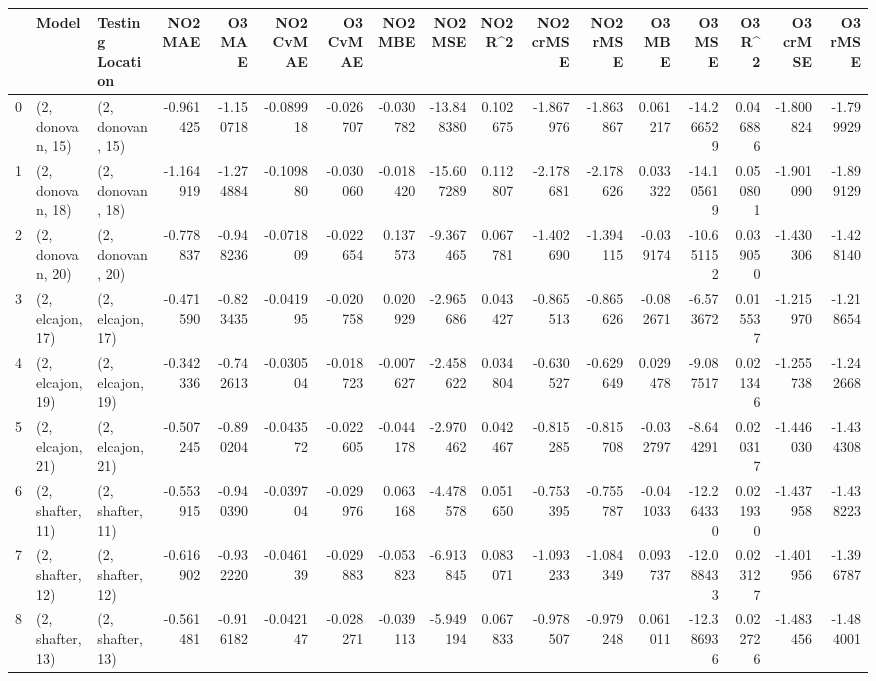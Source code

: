 \begin{tabular}{lllrrrrrrrrrrrrrr}
\toprule
{} &             Model &  Testing Location &   NO2 MAE &    O3 MAE &  NO2 CvMAE &  O3 CvMAE &   NO2 MBE &    NO2 MSE &   NO2 R\textasciicircum2 &  NO2 crMSE &  NO2 rMSE &    O3 MBE &     O3 MSE &    O3 R\textasciicircum2 &  O3 crMSE &   O3 rMSE \\
\midrule
0  &  (2, donovan, 15) &  (2, donovan, 15) & -0.961425 & -1.150718 &  -0.089918 & -0.026707 & -0.030782 & -13.848380 &  0.102675 &  -1.867976 & -1.863867 &  0.061217 & -14.266529 &  0.046886 & -1.800824 & -1.799929 \\
1  &  (2, donovan, 18) &  (2, donovan, 18) & -1.164919 & -1.274884 &  -0.109880 & -0.030060 & -0.018420 & -15.607289 &  0.112807 &  -2.178681 & -2.178626 &  0.033322 & -14.105619 &  0.050801 & -1.901090 & -1.899129 \\
2  &  (2, donovan, 20) &  (2, donovan, 20) & -0.778837 & -0.948236 &  -0.071809 & -0.022654 &  0.137573 &  -9.367465 &  0.067781 &  -1.402690 & -1.394115 & -0.039174 & -10.651152 &  0.039050 & -1.430306 & -1.428140 \\
3  &  (2, elcajon, 17) &  (2, elcajon, 17) & -0.471590 & -0.823435 &  -0.041995 & -0.020758 &  0.020929 &  -2.965686 &  0.043427 &  -0.865513 & -0.865626 & -0.082671 &  -6.573672 &  0.015537 & -1.215970 & -1.218654 \\
4  &  (2, elcajon, 19) &  (2, elcajon, 19) & -0.342336 & -0.742613 &  -0.030504 & -0.018723 & -0.007627 &  -2.458622 &  0.034804 &  -0.630527 & -0.629649 &  0.029478 &  -9.087517 &  0.021346 & -1.255738 & -1.242668 \\
5  &  (2, elcajon, 21) &  (2, elcajon, 21) & -0.507245 & -0.890204 &  -0.043572 & -0.022605 & -0.044178 &  -2.970462 &  0.042467 &  -0.815285 & -0.815708 & -0.032797 &  -8.644291 &  0.020317 & -1.446030 & -1.434308 \\
6  &  (2, shafter, 11) &  (2, shafter, 11) & -0.553915 & -0.940390 &  -0.039704 & -0.029976 &  0.063168 &  -4.478578 &  0.051650 &  -0.753395 & -0.755787 & -0.041033 & -12.264330 &  0.021930 & -1.437958 & -1.438223 \\
7  &  (2, shafter, 12) &  (2, shafter, 12) & -0.616902 & -0.932220 &  -0.046139 & -0.029883 & -0.053823 &  -6.913845 &  0.083071 &  -1.093233 & -1.084349 &  0.093737 & -12.088433 &  0.023127 & -1.401956 & -1.396787 \\
8  &  (2, shafter, 13) &  (2, shafter, 13) & -0.561481 & -0.916182 &  -0.042147 & -0.028271 & -0.039113 &  -5.949194 &  0.067833 &  -0.978507 & -0.979248 &  0.061011 & -12.386936 &  0.022726 & -1.483456 & -1.484001 \\

\end{tabular}
